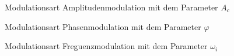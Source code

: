 \begin{figure}
    \centering
	
	\caption{Modulationsart Amplitudenmodulation mit dem Parameter \(A_c\)}
	\label{fig:fm:AM}
\end{figure}

\begin{figure}
    \centering
	
	\caption{Modulationsart Phasenmodulation mit dem Parameter \(\varphi\)}
	\label{fig:fm:PM}
\end{figure}

\begin{figure}
    \centering
	
	\caption{Modulationsart Freguenzmodulation mit dem Parameter \(\omega_i\)}
	\label{fig:fm:FM}
\end{figure}





